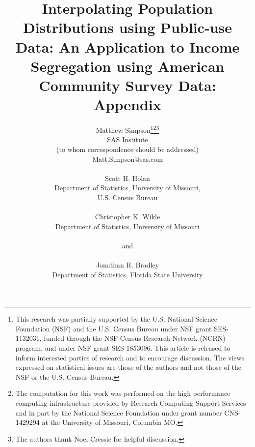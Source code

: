 \documentclass[12pt]{article}
\renewcommand{\baselinestretch}{1.5}
\begin{document}
\def\spacingset#1{\renewcommand{\baselinestretch}%
{#1}\small\normalsize} \spacingset{1}




\vskip 2mm

{
  \title{\bf Interpolating Population Distributions using Public-use Data: An Application to Income Segregation using American Community Survey Data: Appendix}
  \author{Matthew Simpson\thanks{This research was partially supported by the U.S. National Science Foundation (NSF) and the U.S. Census Bureau under NSF grant SES-1132031, funded through the NSF-Census Research Network (NCRN) program, and under NSF grant SES-1853096. This article is released to inform interested parties of research and to encourage discussion.  The views expressed on statistical issues are those of the authors and not those of the NSF or the U.S. Census Bureau.}\thanks{The computation for this work was performed on the high performance computing infrastructure provided by Research Computing Support Services and in part by the National Science Foundation under grant number CNS-1429294 at the University of Missouri, Columbia MO.}\thanks{The authors thank Noel Cressie for helpful discussion.}\hspace{.2cm}\\
    SAS Institute\\
    (to whom correspondence should be addressed)\\
    Matt.Simpson@sas.com\\\\
     Scott H. Holan\\
     Department of Statistics, University of Missouri,\\
     U.S. Census Bureau\\\\
     Christopher K. Wikle\\
       Department of Statistics, University of Missouri\\\\
       and\\\\
       Jonathan R. Bradley\\
       Department of Statistics, Florida State University}
     \maketitle
}
\end{document}
